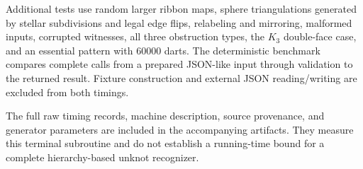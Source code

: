 Additional tests use random larger ribbon maps, sphere triangulations
generated by stellar subdivisions and legal edge flips, relabeling and
mirroring, malformed inputs, corrupted witnesses, all three obstruction
types, the $K_3$ double-face case, and an essential pattern with 60000
darts.  The deterministic benchmark compares complete calls from a
prepared JSON-like input through validation to the returned result.
Fixture construction and external JSON reading/writing are excluded
from both timings.

The full raw timing records, machine description, source provenance,
and generator parameters are included in the accompanying artifacts.
They measure this terminal subroutine and do not establish a running-time
bound for a complete hierarchy-based unknot recognizer.
